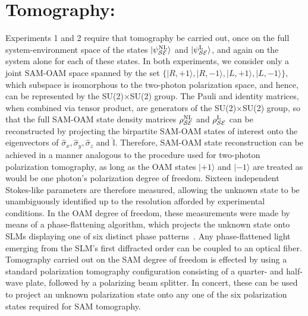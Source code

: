 \documentclass[12pt]{iopart}
\begin{document}
\section{Tomography:}
%
Experiments 1 and 2 require that tomography be carried out, once on the full system-environment space of the states $|\psi^\mathrm{NL}_{\cal SE}\rangle$ and $|\psi^\mathrm{L}_{\cal SE}\rangle$, and again on the system alone for each of these states. In both experiments, we consider only a joint SAM-OAM space spanned by the set $\{|R,+1\rangle,|R,-1\rangle,|L,+1\rangle,|L,-1\rangle\}$, which subspace is isomorphous to the two-photon polarization space, and hence, can be represented by the SU(2)$\times$SU(2) group. The Pauli and identity matrices, when combined via tensor product, are generators of the SU(2)$\times$SU(2) group, so that the full SAM-OAM state density matrices $\rho^\mathrm{NL}_{\cal SE}$ and $\rho^\mathrm{L}_{\cal SE}$ can be reconstructed by projecting the birpartite SAM-OAM states of interest onto the eigenvectors of $\hat{\sigma}_x, \hat{\sigma}_y, \hat{\sigma}_z$ and $\hat{\mathbb{I}}$. Therefore, SAM-OAM state reconstruction can be achieved in a manner analogous to the procedure used for two-photon polarization tomography, as long as the OAM states $|+1\rangle$ and $|-1\rangle$ are treated as would be one photon's polarization degree of freedom. Sixteen independent Stokes-like parameters are therefore measured, allowing the unknown state to be unambiguously identified up to the resolution afforded by experimental conditions. In the OAM degree of freedom, these measurements were made by means of a phase-flattening algorithm, which projects the unknown state onto SLMs displaying one of six distinct phase patterns~\cite{nagali:09}. Any phase-flattened light emerging from the SLM's first diffracted order can be coupled to an optical fiber. Tomography carried out on the SAM degree of freedom is effected by using a standard polarization tomography configuration consisting of a quarter- and half-wave plate, followed by a polarizing beam splitter. In concert, these can be used to project an unknown polarization state onto any one of the six polarization states required for SAM tomography.
\end{document}
